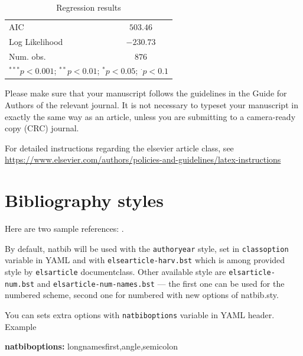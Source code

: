 \documentclass[preprint, 3p,
authoryear]{elsarticle} %
\newenvironment{Shaded}{\begin{snugshade}}{\end{snugshade}}
\newcommand{\AttributeTok}[1]{\textcolor[rgb]{0.13,0.29,0.53}{#1}}
\newcommand{\FunctionTok}[1]{\textcolor[rgb]{0.13,0.29,0.53}{\textbf{#1}}}
\newcommand{\KeywordTok}[1]{\textcolor[rgb]{0.13,0.29,0.53}{\textbf{#1}}}
\begin{document}
\begin{table}
\begin{center}
\begin{footnotesize}
\begin{tabular}{l c}
\hline
AIC                                                                           & $503.46$        \\
Log Likelihood                                                                & $-230.73$       \\
Num. obs.                                                                     & $876$           \\
\hline
\multicolumn{2}{l}{\tiny{$^{***}p<0.001$; $^{**}p<0.01$; $^{*}p<0.05$; $^{\cdot}p<0.1$}}
\end{tabular}
\end{footnotesize}
\caption{\label{tab66}Regression results}
\label{table:coefficients}
\end{center}
\end{table}

Please make sure that your manuscript follows the guidelines in the
Guide for Authors of the relevant journal. It is not necessary to
typeset your manuscript in exactly the same way as an article, unless
you are submitting to a camera-ready copy (CRC) journal.

For detailed instructions regarding the elsevier article class, see
\url{https://www.elsevier.com/authors/policies-and-guidelines/latex-instructions}

\section{Bibliography styles}\label{bibliography-styles}

Here are two sample references: \citeauthor{Feynman1963118}
\citetext{\citeyear{Feynman1963118}; \citealp{Dirac1953888}}.

By default, natbib will be used with the \texttt{authoryear} style, set
in \texttt{classoption} variable in YAML and with
\texttt{elsearticle-harv.bst} which is among provided style by
\texttt{elsarticle} documentclass. Other available style are
\texttt{elsarticle-num.bst} and \texttt{elsarticle-num-names.bst} ---
the first one can be used for the numbered scheme, second one for
numbered with new options of natbib.sty.

You can sets extra options with \texttt{natbiboptions} variable in YAML
header. Example

\begin{Shaded}
\begin{Highlighting}[]
\FunctionTok{natbiboptions}\KeywordTok{:}\AttributeTok{ longnamesfirst,angle,semicolon}
\end{Highlighting}
\end{Shaded}
\end{document}
